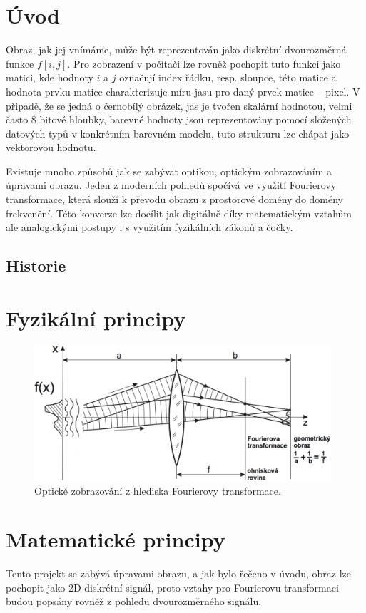 \documentclass[11pt,a4paper]{article}
\newcommand{\titlepageandcontents}{
  

  \pagestyle{plain}
  \pagenumbering{roman}
  \setcounter{page}{1}

  \newpage
  \pagestyle{plain}
  \pagenumbering{arabic}
  \setcounter{page}{1}
}
\begin{document}
\titlepageandcontents
\section{Úvod}
Obraz, jak jej vnímáme, může být reprezentován jako diskrétní dvourozměrná funkce $f[i,j]$.
Pro zobrazení v počítači lze rovněž pochopit tuto funkci jako matici, kde hodnoty $i$ a $j$ 
označují index řádku, resp. sloupce, této matice a hodnota prvku matice charakterizuje míru jasu pro daný
prvek matice -- pixel. V připadě, že se jedná o černobílý obrázek, jas je tvořen skalární hodnotou, 
velmi často 8 bitové hloubky, barevné hodnoty jsou reprezentovány pomocí složených datových typů
v konkrétním barevném modelu, tuto strukturu lze chápat jako vektorovou hodnotu. 

Existuje mnoho způsobů jak se zabývat optikou, optickým zobrazováním a úpravami obrazu.
Jeden z moderních pohledů spočívá ve využití Fourierovy transformace, která slouží k převodu
obrazu z prostorové domény do domény frekvenční. Této konverze lze docílit jak digitálně
díky matematickým vztahům ale analogickými postupy i s využitím fyzikálních zákonů a čočky.

\subsection{Historie}



\section{Fyzikální principy}
\begin{figure}[h!]
\centering
\includegraphics[width=11cm]{images/ft-cocka.png}
\caption{Optické zobrazování z hlediska Fourierovy transformace.}
\label{lcpstack}
\end{figure}




\section{Matematické principy}
Tento projekt se zabývá úpravami obrazu, a jak bylo řečeno v úvodu, obraz lze pochopit jako 2D diskrétní 
signál, proto vztahy pro Fourierovu transformaci budou popsány rovněž z pohledu dvourozměrného signálu.
\end{document}
